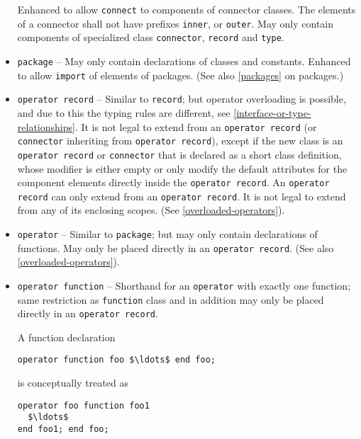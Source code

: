 \begin{itemize}
Enhanced to allow \lstinline!connect! to components of connector classes.  The elements of a connector shall not have prefixes \lstinline!inner!, or \lstinline!outer!.  May only contain components of specialized class \lstinline!connector!, \lstinline!record! and \lstinline!type!.

\item \lstinline!package! --
May only contain declarations of classes and constants.  Enhanced to allow \lstinline!import! of elements of packages.  (See also \cref{packages} on packages.)

\item \lstinline!operator record! --
Similar to \lstinline!record!; but operator overloading is possible, and due to this the typing rules are different, see \cref{interface-or-type-relationships}.  It is not legal to extend from an \lstinline!operator record! (or \lstinline!connector! inheriting from \lstinline!operator record!), except if the new class is an \lstinline!operator record! or \lstinline!connector! that is declared as a short class definition, whose modifier is either empty or only modify the default attributes for the component elements directly inside the \lstinline!operator record!.  An \lstinline!operator record! can only extend from an \lstinline!operator record!.  It is not legal to extend from any of its enclosing scopes.  (See \cref{overloaded-operators}).

\item \lstinline!operator! --
Similar to \lstinline!package!; but may only contain declarations of functions.  May only be placed directly in an \lstinline!operator record!.  (See also \cref{overloaded-operators}).

\item \lstinline!operator function! --
Shorthand for an \lstinline!operator! with exactly one function; same restriction as \lstinline!function! class and in addition may only be placed directly in an \lstinline!operator record!.
\begin{nonnormative}
A function declaration
\begin{lstlisting}[language=modelica]
operator function foo $\ldots$ end foo;
\end{lstlisting}
is conceptually treated as
\begin{lstlisting}[language=modelica]
operator foo function foo1
  $\ldots$
end foo1; end foo;
\end{lstlisting}
\end{nonnormative}

\end{itemize}

